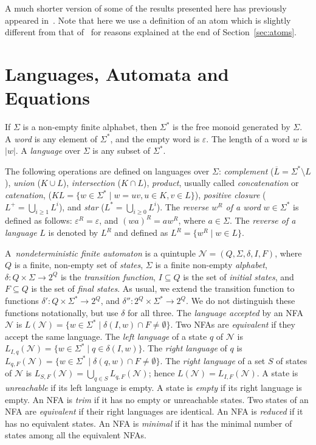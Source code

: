 \documentclass[preprint,12pt]{elsarticle}
\renewcommand{\ge}{\geqslant}
\newcommand{\ol}{\overline}
\newcommand{\eps}{\varepsilon}
\newcommand{\emp}{\emptyset}
\newcommand{\Sig}{\Sigma}
\newcommand{\cN}{{\mathcal N}}
\begin{document}
A much shorter version of some of the results presented here has previously 
appeared in~\cite{BrTa11}. Note that here we use a definition of an atom 
which is slightly different from that of~\cite{BrTa11} for reasons explained 
at the end of Section~\ref{sec:atoms}.



\section{Languages, Automata and Equations}
\label{sec:LAE}
If $\Sig$ is a non-empty finite alphabet, then $\Sig^*$ is the free monoid generated by $\Sig$.
 A \emph{word} is any element of $\Sig^*$, and the empty word is $\eps$. The length of a word $w$ is $|w|$.
A \emph{language} over $\Sig$ is any subset of $\Sig^*$. 

The following   operations are defined on languages over $\Sig$:  
\emph{complement} \linebreak ($\ol{L}=\Sigma^*\setminus L$),  
\emph{union}  ($K\cup L$),  
\emph{intersection} ($K\cap L$),  
\emph{product}, usually called  
\emph{concatenation} or \emph{catenation},   
($KL=\{w\in \Sigma^*\mid w=uv, u\in K, v\in L\}$), \emph{positive closure} ($L^+=\bigcup_{i\ge 1}L^i$), and  \emph{star} ($L^*=\bigcup_{i\ge 0}L^i$).
The \emph{reverse $w^R$ of a word} $w\in\Sigma^*$ is defined as follows: 
$\eps^R=\eps$, and $(wa)^R=aw^R$, where $a\in\Sig$.
The \emph{reverse of a language} $L$ is denoted 
by $L^R$ and defined as $L^R=\{w^R\mid w\in L\}$.

A~\emph{nondeterministic finite automaton} is a quintuple 
$\cN=(Q, \Sig, \delta, I,F)$, where 
$Q$ is a finite, non-empty set of \emph{states}, 
$\Sig$ is a finite non-empty \emph{alphabet}, 
$\delta:Q\times \Sig\to 2^Q$ is the  \emph{transition function},
$I\subseteq  Q$ is the set of  \emph{initial states},
and $F\subseteq Q$ is the set of \emph{final states}.
As usual, we extend the transition function to functions 
$\delta':Q\times \Sig^*\to 2^Q$, and $\delta'':2^Q\times \Sig^*\to 2^Q$.
We do not distinguish these functions notationally, but use $\delta$ for all three.
The \emph{language accepted} by an NFA $\cN$ is 
$L(\cN)=\{w\in\Sig^*\mid \delta(I,w)\cap F\neq \emp\}$.
Two NFAs are \emph{equivalent} if they accept the same language. 
The  \emph{left language} of a state $q$ of $\cN$ is 
$L_{I,q}(\cN)=\{w\in\Sig^* \mid q\in \delta(I,w)\}$. 
The \emph{right language} of $q$ is 
$L_{q,F}(\cN)=\{w\in\Sig^* \mid \delta(q,w)\cap F\neq\emp\}$.
The \emph{right language} of a set $S$ of states of $\cN$ is
$L_{S,F}(\cN)=\bigcup_{q\in S} L_{q,F}(\cN)$; hence
$L(\cN)=L_{I,F}(\cN)$.
A state is \emph{unreachable} if its left language is empty.
A state is \emph{empty} if its right language is empty.
An NFA is \emph{trim} if it has no empty or unreachable states.
Two states  of an NFA are \emph{equivalent} if their right languages are identical. 
An NFA is \emph{reduced} if it has no equivalent states. 
An NFA is \emph{minimal} if it has the minimal number of states among all
the equivalent NFAs.
\end{document}
